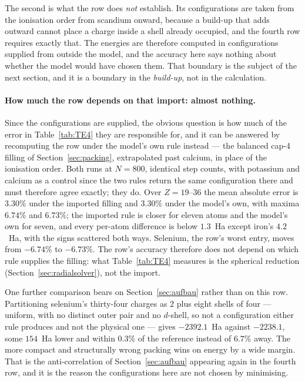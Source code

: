 \documentclass[11pt]{article}
\begin{document}
The second is what the row does \emph{not} establish. Its configurations are taken from the
ionisation order from scandium onward, because a build-up that adds outward cannot place a charge
inside a shell already occupied, and the fourth row requires exactly that. The energies are
therefore computed in configurations supplied from outside the model, and the accuracy here says
nothing about whether the model would have chosen them. That boundary is the subject of the next
section, and it is a boundary in the \emph{build-up}, not in the calculation.

\paragraph{How much the row depends on that import: almost nothing.} Since the configurations are
supplied, the obvious question is how much of the error in Table~\ref{tab:TE4} they are responsible
for, and it can be answered by recomputing the row under the model's own rule instead --- the
balanced cap-4 filling of Section~\ref{sec:packing}, extrapolated past calcium, in place of the
ionisation order. Both runs at $N=800$, identical step counts, with potassium and calcium as a
control since the two rules return the same configuration there and must therefore agree exactly;
they do. Over $Z=19$--$36$ the mean absolute error is $3.30\%$ under the imported filling and
$3.30\%$ under the model's own, with maxima $6.74\%$ and $6.73\%$; the imported rule is closer for
eleven atoms and the model's own for seven, and every per-atom difference is below $1.3$~Ha except
iron's $4.2$~Ha, with the signs scattered both ways. Selenium, the row's worst entry, moves from
$-6.74\%$ to $-6.73\%$. The row's accuracy therefore does not depend on which rule supplies the
filling: what Table~\ref{tab:TE4} measures is the spherical reduction (Section~\ref{sec:radialsolver}),
not the import.

One further comparison bears on Section~\ref{sec:aufbau} rather than on this row. Partitioning
selenium's thirty-four charges as $2$ plus eight shells of four --- uniform, with no distinct outer
pair and no $d$-shell, so not a configuration either rule produces and not the physical one ---
gives $-2392.1$~Ha against $-2238.1$, some $154$~Ha lower and within $0.3\%$ of the reference instead
of $6.7\%$ away. The more compact and structurally wrong packing wins on energy by a wide margin.
That is the anti-correlation of Section~\ref{sec:aufbau} appearing again in the fourth row, and it is
the reason the configurations here are not chosen by minimising.
\end{document}
